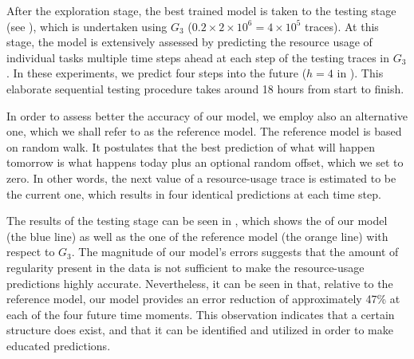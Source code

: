 After the exploration stage, the best trained model is taken to the testing
stage (see ), which is undertaken using $G_3$ ($0.2 \times 2
\times 10^6 = 4 \times 10^5$ traces). At this stage, the model is extensively
assessed by predicting the resource usage of individual tasks multiple time
steps ahead at each step of the testing traces in $G_3$. In these experiments,
we predict four steps into the future ($h = 4$ in ). This
elaborate sequential testing procedure takes around 18 hours from start to
finish.

In order to assess better the accuracy of our model, we employ also an
alternative one, which we shall refer to as the reference model. The reference
model is based on random walk. It postulates that the best prediction of what
will happen tomorrow is what happens today plus an optional random offset, which
we set to zero. In other words, the next value of a resource-usage trace is
estimated to be the current one, which results in four identical predictions at
each time step.

The results of the testing stage can be seen in , which shows the
 of our model (the blue line) as well as the one of the reference model
(the orange line) with respect to $G_3$. The magnitude of our model's errors
suggests that the amount of regularity present in the data is not sufficient to
make the resource-usage predictions highly accurate. Nevertheless, it can be
seen in  that, relative to the reference model, our model provides
an error reduction of approximately 47\% at each of the four future time
moments. This observation indicates that a certain structure does exist, and
that it can be identified and utilized in order to make educated predictions.
